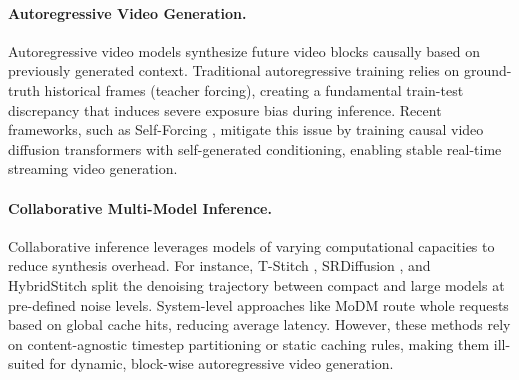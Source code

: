 \documentclass{article} %
\begin{document}
\paragraph{Autoregressive Video Generation.}
Autoregressive video models synthesize future video blocks causally based on previously generated context. Traditional autoregressive training relies on ground-truth historical frames (teacher forcing), creating a fundamental train-test discrepancy that induces severe exposure bias during inference. Recent frameworks, such as Self-Forcing \citep{huang2025selfforcingbridgingtraintest}, mitigate this issue by training causal video diffusion transformers with self-generated conditioning, enabling stable real-time streaming video generation.

\paragraph{Collaborative Multi-Model Inference.}
Collaborative inference leverages models of varying computational capacities to reduce synthesis overhead. For instance, T-Stitch \citep{pan2024tstitchacceleratingsamplingpretrained}, SRDiffusion \citep{cheng2025srdiffusionacceleratevideodiffusion}, and HybridStitch \citep{sun2026hybridstitch} split the denoising trajectory between compact and large models at pre-defined noise levels. System-level approaches like MoDM \citep{xia2025modmefficientservingimage} route whole requests based on global cache hits, reducing average latency. However, these methods rely on content-agnostic timestep partitioning or static caching rules, making them ill-suited for dynamic, block-wise autoregressive video generation.
\end{document}
